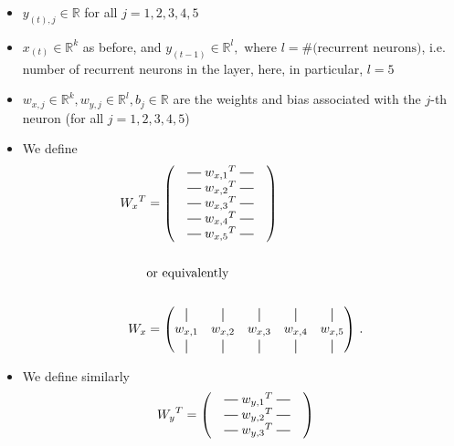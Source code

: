 \documentclass{article}
\newcommand*{\vertbar}{\rule[-1ex]{0.5pt}{2.5ex}}
\newcommand*{\horzbar}{\rule[.5ex]{2.5ex}{0.5pt}}
\begin{document}
\begin{itemize}
  \item $y_{(t), j} \in \mathbb{R}$ for all $j=1,2,3,4,5$
  \item $x_{(t)} \in \mathbb{R}^{k}$ as before, and $y_{(t-1)} \in \mathbb{R}^{l},$ where $l = \text{\#(recurrent neurons)}$, i.e. number of recurrent neurons in the layer, here, in particular, $l=5$
  \item $w_{x,j} \in \mathbb{R}^k, w_{y,j} \in \mathbb{R}^l, b_{j} \in \mathbb{R}$ are the weights and bias associated with the $j$-th neuron (for all $j=1,2,3,4,5$)
  \item We define
    \begin{align*}
      {W_x}^{T} &= \begin{pmatrix}
        \quad\horzbar\;{w_{x,1}}^T{}\;\horzbar\quad \\
        \quad\horzbar\;{w_{x,2}}^T{}\;\horzbar\quad \\
        \quad\horzbar\;{w_{x,3}}^T{}\;\horzbar\quad \\
        \quad\horzbar\;{w_{x,4}}^T{}\;\horzbar\quad \\
        \quad\horzbar\;{w_{x,5}}^T{}\;\horzbar\quad \\
      \end{pmatrix} \\
      \\
      \qquad &{}\text{or equivalently} \\
      \\
      {W_x} &= \begin{pmatrix}
        \vertbar & \vertbar & \vertbar & \vertbar & \vertbar \\
        w_{x,1} & w_{x,2} & w_{x,3} & w_{x,4} & w_{x,5} \\
        \vertbar & \vertbar & \vertbar & \vertbar & \vertbar
      \end{pmatrix}\,.
    \end{align*}
  \item We define similarly
    \begin{align*}
      {W_y}^{T} &= \begin{pmatrix}
        \quad\horzbar\;{w_{y,1}}^T{}\;\horzbar\quad \\
        \quad\horzbar\;{w_{y,2}}^T{}\;\horzbar\quad \\
        \quad\horzbar\;{w_{y,3}}^T{}\;\horzbar\quad \\

\end{pmatrix}
\end{align*}
\end{itemize}
\end{document}
